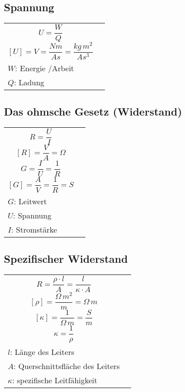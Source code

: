 \subsection{Spannung}
\label{sec:Spannung}
\begin{tabular}{l l}
	\begin{minipage}[l]{5cm}
		\[
		U=\frac{W}{Q}
		\]
		\[
		[U]=V=\frac{Nm}{As}=\frac{kg\,m^2}{As^3}
		\]
	\end{minipage}
&
	\begin{minipage}[l]{5cm}
		$U$: Spannung \\
		$W$: Energie /Arbeit \\
		$Q$: Ladung
	\end{minipage}
\end{tabular}

\subsection{Das ohmsche Gesetz (Widerstand)}
\label{sec:DasOhmscheGesetzWiderstand}

\begin{tabular}{l l}
	\begin{minipage}[l]{5cm}
		\[
		R=\frac{U}{I}
		\]
		\[
		[R]=\frac{V}{A}=\Omega
		\]
		\[
		G=\frac{I}{U}=\frac{1}{R}
		\]
		\[
		[G]=\frac{A}{V}=\frac{1}{R}=S
		\]
	\end{minipage}
	&
	\begin{minipage}[l]{5cm}
		$R$: Widerstand \\
		$G$: Leitwert \\
		$U$: Spannung \\
		$I$: Stromstärke 
	\end{minipage}
\end{tabular}

\subsection{Spezifischer Widerstand}
\label{sec:SpezifischerWiderstand}

\begin{tabular}{l l}
	\begin{minipage}[l]{5cm}
		\[
		R=\frac{\rho\cdot l}{A} = \frac{l}{\kappa\cdot A}
		\]
		\[
		[\rho]=\frac{\Omega \, m^2}{m}=\Omega \, m
		\]
		\[
		[\kappa]=\frac{1}{\Omega \, m}=\frac{S}{m}
		\]
		\[
		\kappa=\frac{1}{\rho}
		\]
	\end{minipage}
	&
	\begin{minipage}[l]{6cm}
		$\rho$: spezifischer Widerstand \\
		$l$: Länge des Leiters \\
		$A$: Querschnittsfläche des Leiters \\
		$\kappa$: spezifische Leitfähigkeit
	\end{minipage}
\end{tabular}


